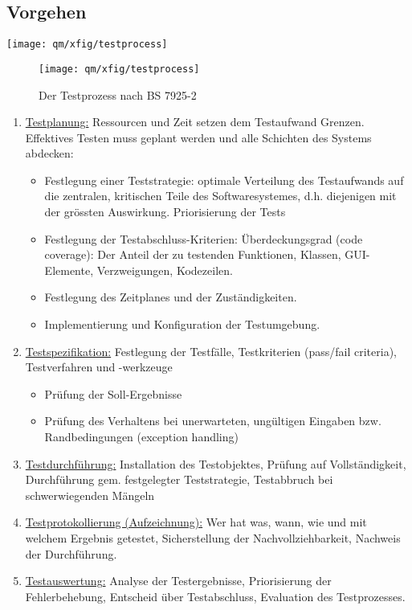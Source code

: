 \subsection{Vorgehen}
%
\ifslides
\texttt{[image: qm/xfig/testprocess]}\\
\newslide
\else
\begin{figure}[H]
\begin{center}
\texttt{[image: qm/xfig/testprocess]}\\
\end{center}
\caption{Der Testprozess nach BS 7925-2}
\end{figure}
\fi
%
\begin{enumerate}
\item \underline{Testplanung:}
Ressourcen und Zeit setzen dem Testaufwand Grenzen. Effektives Testen
muss geplant werden und alle Schichten des Systems abdecken:
\begin{itemize}
\item Festlegung einer Teststrategie: optimale Verteilung des Testaufwands auf
  die zentralen, kritischen Teile des Softwaresystemes,
  d.h. diejenigen mit der grössten Auswirkung. Priorisierung der Tests
\item Festlegung der Testabschluss-Kriterien: Überdeckungsgrad (code
  coverage): Der Anteil der zu
  testenden Funktionen, Klassen, GUI-Elemente, Verzweigungen, Kodezeilen.
\item Festlegung des Zeitplanes und der Zuständigkeiten.
\item Implementierung und Konfiguration der Testumgebung.
\end{itemize}
\ifslides
\newpage
\fi
\item \underline{Testspezifikation:} Festlegung der Testfälle, Testkriterien (pass/fail
  criteria), Testverfahren und -werkzeuge
  \begin{itemize}
  \item Prüfung der Soll-Ergebnisse
  \item Prüfung des Verhaltens bei unerwarteten, ungültigen Eingaben
  bzw. Randbedingungen (exception handling)
  \end{itemize}
\item \underline{Testdurchführung:}
  Installation des Testobjektes, Prüfung auf Vollständigkeit, Durchführung
  gem. festgelegter Teststrategie, Testabbruch bei schwerwiegenden Mängeln
\ifslides
\newpage
\fi
\item \underline{Testprotokollierung (Aufzeichnung):} Wer hat was, wann, wie und mit
  welchem Ergebnis getestet, Sicherstellung der Nachvollziehbarkeit, Nachweis
  der Durchführung.
\item \underline{Testauswertung:} Analyse der Testergebnisse, Priorisierung der
  Fehlerbehebung, Entscheid über Testabschluss, Evaluation des Testprozesses.
\end{enumerate}
%
\newpage

